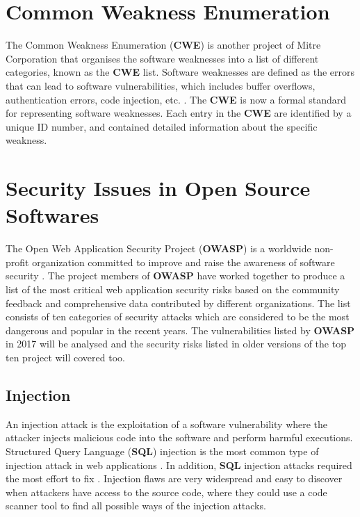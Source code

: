 \documentclass[12pt, a4paper]{report}
\begin{document}
\section{Common Weakness Enumeration}
The Common Weakness Enumeration (\textbf{CWE}) is another project of Mitre Corporation \cite{cwe}
that organises the software weaknesses into a list of different categories, known as the
\textbf{CWE} list. Software weaknesses are defined as the errors that can lead to software
vulnerabilities, which includes buffer overflows, authentication errors, code injection, etc.
\cite{cwe_faq}. The \textbf{CWE} is now a formal standard for representing software weaknesses. Each
entry in the \textbf{CWE} are identified by a unique ID number, and contained detailed information
about the specific weakness.

\section{Security Issues in Open Source Softwares}
The Open Web Application Security Project (\textbf{OWASP}) is a worldwide non-profit organization
committed to improve and raise the awareness of software security \cite{owasp_home}. The project
members of \textbf{OWASP} have worked together to produce a list of the most critical web
application security risks based on the community feedback and comprehensive data contributed by
different organizations. The list consists of ten categories of security attacks which are
considered to be the most dangerous and popular in the recent years. The vulnerabilities listed by
\textbf{OWASP} in 2017 \cite{owasp_top10} will be analysed and the security risks listed in older
versions of the top ten project will covered too.

\subsection{Injection}
An injection attack is the exploitation of a software vulnerability where the attacker injects
malicious code into the software and perform harmful executions. Structured Query Language
(\textbf{SQL}) injection is the most common type of injection attack in web applications
\cite{pietraszek_2006}. In addition, \textbf{SQL} injection attacks required the most effort to fix
\cite{othmane_2015}. Injection flaws are very widespread and easy to discover when attackers have
access to the source code, where they could use a code scanner tool to find all possible ways of the
injection attacks.
\end{document}
